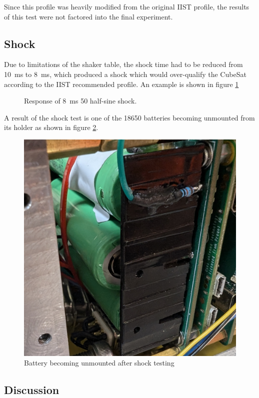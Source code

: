 \documentclass[]{report}
\begin{document}
Since this profile was heavily modified from the original IIST profile, the results of this test were not factored into the final experiment.

\subsection{Shock}

Due to limitations of the shaker table, the shock time had to be reduced from \SI{10}{\milli\second} to \SI{8}{\milli\second}, which produced a shock which would over-qualify the CubeSat according to the IIST recommended profile. An example is shown in figure \ref{fig:shock-table-resp}

\begin{figure}[H]
  \centering
  
  \caption{Response of \SI{8}{\milli\second} \SI{50}{\gacc} half-sine shock.}
  \label{fig:shock-table-resp}
\end{figure}

A result of the shock test is one of the 18650 batteries becoming unmounted from its holder as shown in figure \ref{fig:dislodged-battery}.

\begin{figure}[H]
  \centering
  \includegraphics[width=0.7\linewidth]{images/dislodged_battery.jpg}
  \caption{Battery becoming unmounted after shock testing}
  \label{fig:dislodged-battery}
\end{figure}

\subsection{Discussion}
\end{document}
